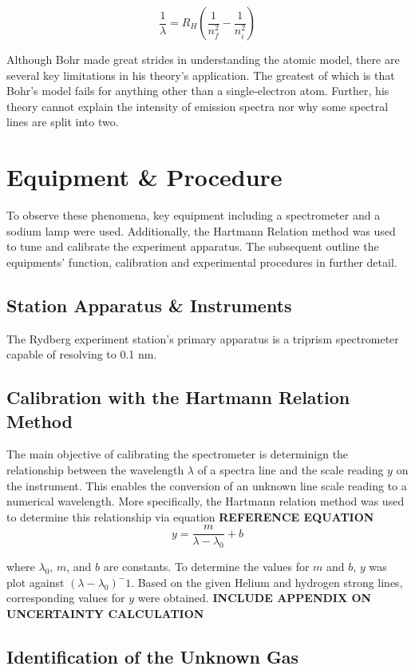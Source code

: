 \documentclass{article} %
\begin{document}
\begin{multicols}{2}
\[
\frac{1}{\lambda} = R_H \left( \frac{1}{n_f^2} - \frac{1}{n_i^2} \right)
\]

Although Bohr made great strides in understanding the atomic model, there are several key limitations in his theory's application.
The greatest of which is that Bohr's model fails for anything other than a single-electron atom.
Further, his theory cannot explain the intensity of emission spectra nor why some spectral lines are split into two.

\section{Equipment \& Procedure}

To observe these phenomena, key equipment including a spectrometer and a sodium lamp were used.
Additionally, the Hartmann Relation method was used to tune and calibrate the experiment apparatus.
The subsequent outline the equipments' function, calibration and experimental procedures in further detail.

\subsection{Station Apparatus \& Instruments}

The Rydberg experiment station's primary apparatus is a triprism spectrometer capable of resolving to 0.1 nm.


\subsection{Calibration with the Hartmann Relation Method}

The main objective of calibrating the spectrometer is determinign the relationship between the wavelength $\lambda$ of a spectra line and the scale reading $y$ on the instrument.
This enables the conversion of an unknown line scale reading to a numerical wavelength.
More specifically, the Hartmann relation method was used to determine this relationship via equation \textbf{REFERENCE EQUATION}
\[
y = \frac{m}{\lambda - \lambda_0} + b
\]

where $\lambda_0$, $m$, and $b$ are constants.
To determine the values for $m$ and $b$, $y$ was plot against $(\lambda - \lambda_0)^-1$.
Based on the given Helium and hydrogen strong lines, corresponding values for $y$ were obtained.
\textbf{INCLUDE APPENDIX ON UNCERTAINTY CALCULATION}

\subsection{Identification of the Unknown Gas}


\end{multicols}
\end{document}
